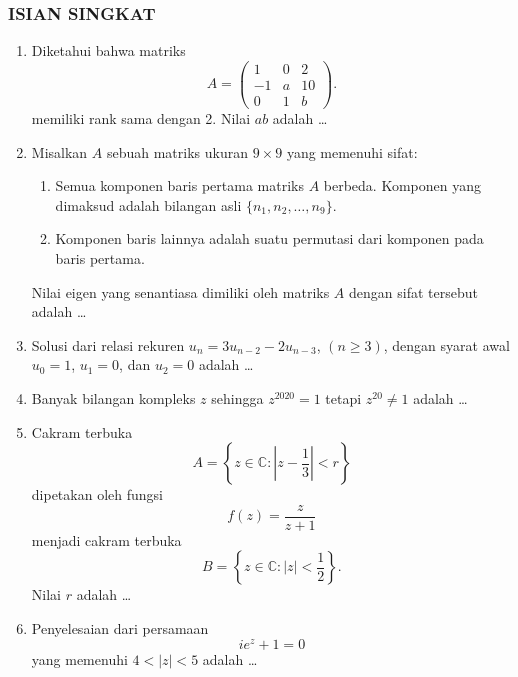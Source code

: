 \documentclass[12pt,twoside]{article}
\begin{document}
\subsubsection*{ISIAN SINGKAT}
\begin{enumerate}
	\item Diketahui bahwa matriks
	      \[
		      A = \begin{pmatrix} 1 & 0 & 2 \\ -1 & a & 10 \\ 0 & 1 & b \end{pmatrix}.
	      \]
	      memiliki rank sama dengan 2. Nilai $ab$ adalah \dots

	\item Misalkan $A$ sebuah matriks ukuran $9 \times 9$ yang memenuhi sifat:
	      \begin{enumerate}
		      \item Semua komponen baris pertama matriks $A$ berbeda. Komponen yang dimaksud adalah bilangan asli $\{ n_1, n_2, \dots, n_9 \}$.
		      \item Komponen baris lainnya adalah suatu permutasi dari komponen pada baris pertama.
	      \end{enumerate}
	      Nilai eigen yang senantiasa dimiliki oleh matriks $A$ dengan sifat tersebut adalah \dots

	\item Solusi dari relasi rekuren $u_n = 3u_{n-2} - 2u_{n-3}$, $(n \geq 3)$, dengan syarat awal $u_0 = 1$, $u_1 = 0$, dan $u_2 = 0$ adalah \dots

	\item Banyak bilangan kompleks $z$ sehingga $z^{2020} = 1$ tetapi $z^{20} \neq 1$ adalah \dots

	\item Cakram terbuka
	      \[
		      A = \left\{ z \in \mathbb{C} : \left| z - \frac{1}{3} \right| < r \right\}
	      \]
	      dipetakan oleh fungsi
	      \[
		      f(z) = \frac{z}{z+1}
	      \]
	      menjadi cakram terbuka
	      \[
		      B = \left\{ z \in \mathbb{C} : |z| < \frac{1}{2} \right\}.
	      \]
	      Nilai $r$ adalah \dots

	\item Penyelesaian dari persamaan
	      \[
		      ie^z + 1 = 0
	      \]
	      yang memenuhi $4 < |z| < 5$ adalah \dots
\end{enumerate}
\end{document}
